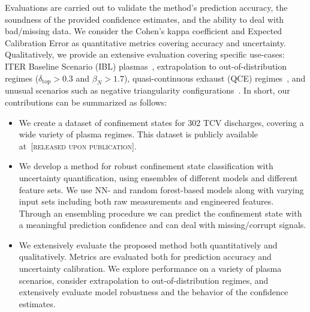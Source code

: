 Evaluations are carried out to validate the method's prediction accuracy, the soundness of the provided confidence estimates, and the ability to deal with bad/missing data. We consider the Cohen's kappa coefficient and Expected Calibration Error as quantitative metrics covering accuracy and uncertainty. Qualitatively, we provide an extensive evaluation covering specific use-cases: ITER Baseline Scenario (IBL) plasmas~\cite{labit2024}, extrapolation to out-of-distribution regimes ($\delta_{\text{top}} > 0.3$ and $\beta_N > 1.7$), quasi-continuous exhaust (QCE) regimes~\cite{labit2019}, and unusual scenarios such as negative triangularity configurations~\cite{coda2022}. In short, our contributions can be summarized as follows:
\begin{itemize}
\item We create a dataset of confinement states for 302 TCV discharges, covering a wide variety of plasma regimes. This dataset is publicly available at~{[\textsc{released upon publication}]}.
\item We develop a method for robust confinement state classification with uncertainty quantification, using ensembles of different models and different feature sets. We use NN- and random forest-based models along with varying input sets including both raw measurements and engineered features. Through an ensembling procedure we can predict the confinement state with a meaningful prediction confidence and can deal with missing/corrupt signals.
\item We extensively evaluate the proposed method both quantitatively and qualitatively. Metrics are evaluated both for prediction accuracy and uncertainty calibration. We explore performance on a variety of plasma scenarios, consider extrapolation to out-of-distribution regimes, and extensively evaluate model robustness and the behavior of the confidence estimates.
\end{itemize}







